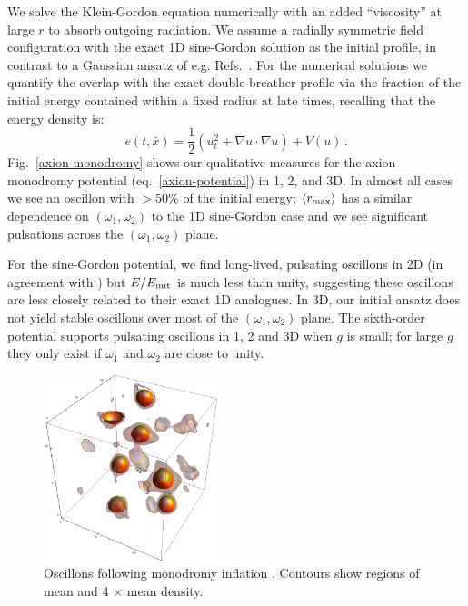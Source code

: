 \documentclass[%
reprint,
superscriptaddress,
amsmath,amssymb,
aps,
prl,
floatfix,
nofootinbib
]{revtex4-1}
\begin{document}
We solve the Klein-Gordon equation numerically with an added ``viscosity''  at large $r$ to absorb outgoing radiation. We assume a radially symmetric field configuration with the exact 1D sine-Gordon solution as the initial profile, in contrast to  a Gaussian ansatz of e.g. Refs.~\cite{Hindmarsh:2006ur,Gleiser:2008ty,Gleiser:2009ys,Salmi:2012ta}.  For the numerical solutions we quantify the overlap with the exact double-breather profile via the fraction of the initial  energy contained within a fixed radius at late times, recalling that the energy density is:
%
\begin{equation}
  e(t,\bar{x}) = \frac{1}{2}\left(u_t^2+ \nabla u\cdot\nabla u \right) + V(u) \, .
\end{equation}
%
Fig.~\ref{axion-monodromy} shows our qualitative measures for the axion monodromy potential (eq.~\ref{axion-potential}) in 1, 2, and 3D. In almost all cases we see an oscillon with $>50\%$ of the initial energy; $\langle r_{\rm max}\rangle$ has a similar dependence on $(\omega_1,\omega_2)$ to the 1D sine-Gordon case and we see significant pulsations across the $(\omega_1,\omega_2)$ plane.

For the sine-Gordon potential, we find long-lived, pulsating oscillons in 2D (in agreement with  \cite{Hindmarsh:2006ur}) but $E/E_{\rm init}$ is much less than unity, suggesting these oscillons are  less closely related to their exact 1D analogues. In 3D, our initial ansatz does not yield stable oscillons over most of the $(\omega_1,\omega_2)$ plane. The sixth-order potential  supports pulsating oscillons  in 1, 2 and 3D when $g$ is small; for large $g$ they only exist if  $\omega_1$ and $\omega_2$ are close to unity. 

\begin{figure}
  \centering
  \includegraphics[width=0.45\textwidth]{plot/3dRE.png}
  \caption{Oscillons following monodromy inflation  \cite{Easther:2010qz}. Contours show regions of mean and 4 $\times$ mean density. }\label{oscillons}
\end{figure}
\end{document}
